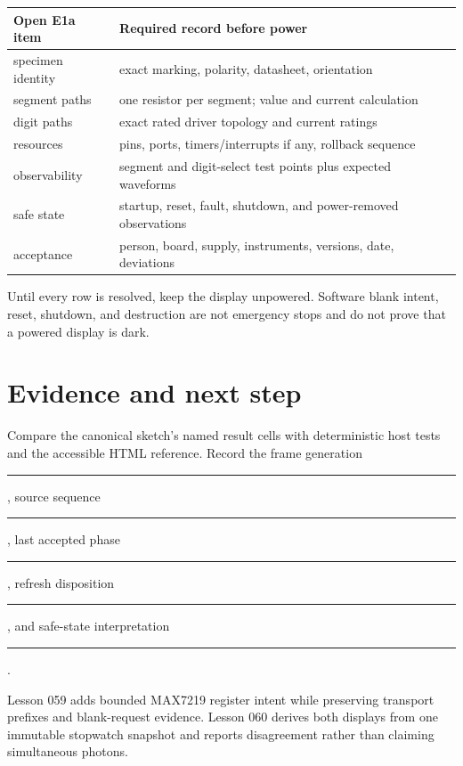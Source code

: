 \documentclass[10pt]{article}
\newcommand{\blankline}{\rule{0.76in}{0.4pt}}
\newcommand{\longblank}{\rule{1.28in}{0.4pt}}
\begin{document}
\begin{tabularx}{\linewidth}{@{}l X@{}}
\toprule
Open E1a item & Required record before power\\
\midrule
specimen identity & exact marking, polarity, datasheet, orientation\\
segment paths & one resistor per segment; value and current calculation\\
digit paths & exact rated driver topology and current ratings\\
resources & pins, ports, timers/interrupts if any, rollback sequence\\
observability & segment and digit-select test points plus expected waveforms\\
safe state & startup, reset, fault, shutdown, and power-removed observations\\
acceptance & person, board, supply, instruments, versions, date, deviations\\
\bottomrule
\end{tabularx}

Until every row is resolved, keep the display unpowered. Software blank
intent, reset, shutdown, and destruction are not emergency stops and do not
prove that a powered display is dark.

\section{Evidence and next step}
Compare the canonical sketch's named result cells with deterministic host
tests and the accessible HTML reference. Record the frame generation
\blankline, source sequence \blankline, last accepted phase \blankline,
refresh disposition \blankline, and safe-state interpretation
\longblank.

Lesson 059 adds bounded MAX7219 register intent while preserving transport
prefixes and blank-request evidence. Lesson 060 derives both displays from
one immutable stopwatch snapshot and reports disagreement rather than
claiming simultaneous photons.
\end{document}
